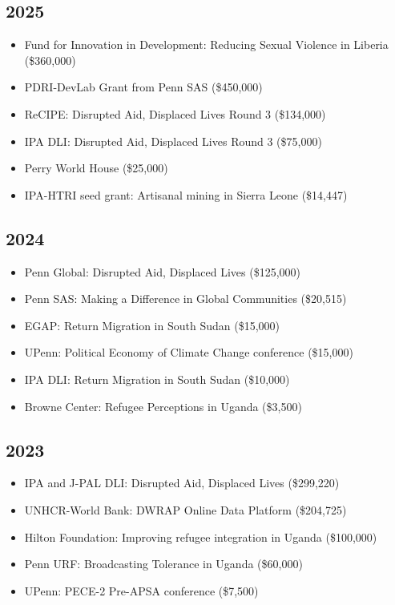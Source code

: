 \documentclass[10pt,a4paper]{article}
\begin{document}
\subsection*{2025}
\begin{itemize}[leftmargin=1em, itemsep=1pt, topsep=2pt, label=\textcolor{secondary}{$\bullet$}]
\item Fund for Innovation in Development: Reducing Sexual Violence in Liberia (\$360,000)
\item PDRI-DevLab Grant from Penn SAS (\$450,000)
\item ReCIPE: Disrupted Aid, Displaced Lives Round 3 (\$134,000)
\item IPA DLI: Disrupted Aid, Displaced Lives Round 3 (\$75,000)
\item Perry World House (\$25,000)
\item IPA-HTRI seed grant: Artisanal mining in Sierra Leone (\$14,447)
\end{itemize}

\subsection*{2024}
\begin{itemize}[leftmargin=1em, itemsep=1pt, topsep=2pt, label=\textcolor{secondary}{$\bullet$}]
\item Penn Global: Disrupted Aid, Displaced Lives (\$125,000)
\item Penn SAS: Making a Difference in Global Communities (\$20,515)
\item EGAP: Return Migration in South Sudan (\$15,000)
\item UPenn: Political Economy of Climate Change conference (\$15,000)
\item IPA DLI: Return Migration in South Sudan (\$10,000)
\item Browne Center: Refugee Perceptions in Uganda (\$3,500)
\end{itemize}

\subsection*{2023}
\begin{itemize}[leftmargin=1em, itemsep=1pt, topsep=2pt, label=\textcolor{secondary}{$\bullet$}]
\item IPA and J-PAL DLI: Disrupted Aid, Displaced Lives (\$299,220)
\item UNHCR-World Bank: DWRAP Online Data Platform (\$204,725)
\item Hilton Foundation: Improving refugee integration in Uganda (\$100,000)
\item Penn URF: Broadcasting Tolerance in Uganda (\$60,000)
\item UPenn: PECE-2 Pre-APSA conference (\$7,500)
\end{itemize}
\end{document}
